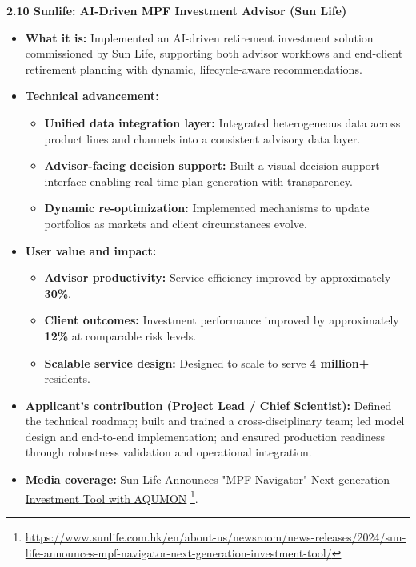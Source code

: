 \documentclass[11pt]{article}
\newcommand{\CVSubsection}[1]{\textbf{#1}\par}
\newenvironment{tightitemize}{%
  \begin{itemize}[leftmargin=*,nosep,topsep=2pt]
}{\end{itemize}}
\begin{document}
\vspace{0.8em}

\CVSubsection{2.10 Sunlife: AI-Driven MPF Investment Advisor (Sun Life)}

\begin{tightitemize}
  \item \textbf{What it is:} Implemented an AI-driven retirement investment solution commissioned by Sun Life, supporting both advisor workflows and end-client retirement planning with dynamic, lifecycle-aware recommendations.
  \item \textbf{Technical advancement:}
  \begin{tightitemize}
    \item \textbf{Unified data integration layer:} Integrated heterogeneous data across product lines and channels into a consistent advisory data layer.
    \item \textbf{Advisor-facing decision support:} Built a visual decision-support interface enabling real-time plan generation with transparency.
    \item \textbf{Dynamic re-optimization:} Implemented mechanisms to update portfolios as markets and client circumstances evolve.
  \end{tightitemize}
  \item \textbf{User value and impact:}
  \begin{tightitemize}
    \item \textbf{Advisor productivity:} Service efficiency improved by approximately \textbf{30\%}.
    \item \textbf{Client outcomes:} Investment performance improved by approximately \textbf{12\%} at comparable risk levels.
    \item \textbf{Scalable service design:} Designed to scale to serve \textbf{4 million+} residents.
  \end{tightitemize}
  \item \textbf{Applicant’s contribution (Project Lead / Chief Scientist):} Defined the technical roadmap; built and trained a cross-disciplinary team; led model design and end-to-end implementation; and ensured production readiness through robustness validation and operational integration.
    \item \textbf{Media coverage:}
  \href{https://www.sunlife.com.hk/en/about-us/newsroom/news-releases/2024/sun-life-announces-mpf-navigator-next-generation-investment-tool/}{Sun Life Announces "MPF Navigator" Next-generation Investment Tool with AQUMON}
  \footnote{\url{https://www.sunlife.com.hk/en/about-us/newsroom/news-releases/2024/sun-life-announces-mpf-navigator-next-generation-investment-tool/}}.
\end{tightitemize}
\end{document}
